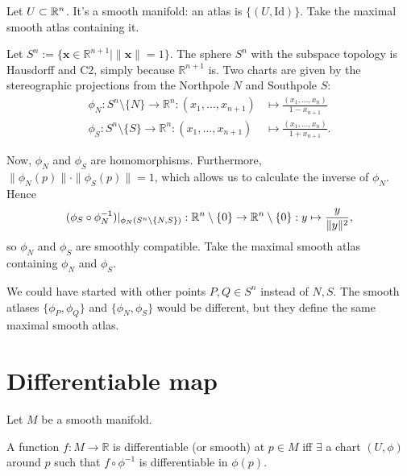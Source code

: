 \begin{eg}
    Let $U \subset \mathbb{R}^n$. It's a smooth manifold: an atlas is $\{(U, \text{Id})\}$. Take the maximal smooth atlas containing it.
\end{eg}
\begin{eg}
    Let $S^{n} := \{\mathbf{x} \in \mathbb R^{n+1}  \mid \|\mathbf{x}\| = 1\}$.
    The sphere $S^{n}$ with the subspace topology is Hausdorff and C2, simply because $\mathbb R^{n+1} $ is.
    Two charts are given by the stereographic projections from the Northpole $N$ and Southpole $S$:
    \begin{align*}
        \phi_N: S^{n} \setminus \{N\} \to \mathbb R^{n}: (x_1, \ldots, x_{n +1}) &\mapsto \frac{(x_1, \ldots, x_n)}{1 - x_{n+1}}\\
        \phi_S: S^{n} \setminus \{S\} \to \mathbb R^{n}: (x_1, \ldots, x_{n+1}) &\mapsto \frac{(x_1, \ldots, x_n)}{1 + x_{n+1}}
    .\end{align*}

    Now, $\phi_N$ and  $\phi_S$ are homomorphisms.
    Furthermore, $\|\phi_N(p)\|\cdot \|\phi_S(p)\| = 1$, which allows us to calculate the inverse of $\phi_{N}$.
    Hence
    \[
        (\phi_S \circ \phi_N ^{-1})|_{\phi_N(S^n\setminus\{N,S\})}: \mathbb{R}^n \setminus \{0\} \to  \mathbb{R}^n \setminus \{0\}: y \mapsto \frac{y}{\|y\|^2}
    ,\] 
    so $\phi_N$ and  $\phi_S$ are smoothly compatible.
    Take the maximal smooth atlas containing  $\phi_N$ and  $\phi_S$.
\end{eg}
\begin{remark}
    We could have started with other points $P,Q\in S^n$ instead of $N, S$. The smooth atlases $\{\phi_P,\phi_Q\}$ and $\{\phi_N,\phi_S\}$ would be different, but they define    the same maximal smooth atlas.
\end{remark}

\section{Differentiable map}
Let $M$ be a smooth manifold.

\begin{definition}
    A function $f: M \to  \mathbb R$ is differentiable (or smooth) at $p \in M$ iff $\exists$ a chart $(U, \phi)$ around $p$ such that $f \circ \phi^{-1}$ is differentiable in $\phi(p)$.
\end{definition}




